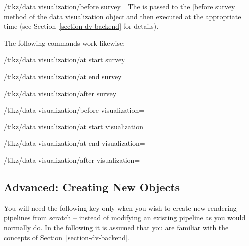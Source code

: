 \begin{key}{/tikz/data visualization/before survey=}
  The  is passed to the |before survey| method of the data
  visualization object and then executed at the appropriate time (see
  Section~\ref{section-dv-backend} for details).

  The following commands work likewise:
\end{key}
\begin{key}{/tikz/data visualization/at start survey=}
\end{key}
\begin{key}{/tikz/data visualization/at end survey=}
\end{key}
\begin{key}{/tikz/data visualization/after survey=}
\end{key}
\begin{key}{/tikz/data visualization/before visualization=}
\end{key}
\begin{key}{/tikz/data visualization/at start visualization=}
\end{key}
\begin{key}{/tikz/data visualization/at end visualization=}
\end{key}
\begin{key}{/tikz/data visualization/after visualization=}
\end{key}



\subsection{Advanced: Creating New Objects}

You will need the following key only when you wish to create new
rendering pipelines from scratch -- instead of modifying an existing
pipeline as you would normally do. In the following it is assumed that
you are familiar with the concepts of Section~\ref{section-dv-backend}.

